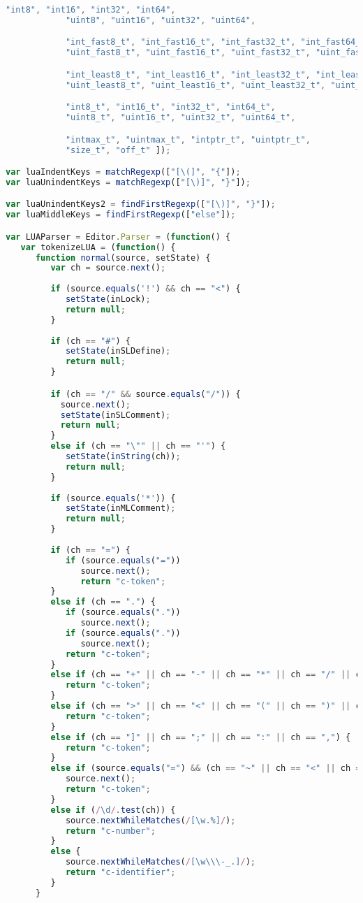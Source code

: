 \begin{lstlisting}[language=Javascript]
            "int8", "int16", "int32", "int64",
            "uint8", "uint16", "uint32", "uint64",

            "int_fast8_t", "int_fast16_t", "int_fast32_t", "int_fast64_t",
            "uint_fast8_t", "uint_fast16_t", "uint_fast32_t", "uint_fast64_t",

            "int_least8_t", "int_least16_t", "int_least32_t", "int_least64_t",
            "uint_least8_t", "uint_least16_t", "uint_least32_t", "uint_least64_t",

            "int8_t", "int16_t", "int32_t", "int64_t",
            "uint8_t", "uint16_t", "uint32_t", "uint64_t",

            "intmax_t", "uintmax_t", "intptr_t", "uintptr_t",
            "size_t", "off_t" ]);

var luaIndentKeys = matchRegexp(["[\(]", "{"]);
var luaUnindentKeys = matchRegexp(["[\)]", "}"]);

var luaUnindentKeys2 = findFirstRegexp(["[\)]", "}"]);
var luaMiddleKeys = findFirstRegexp(["else"]);

var LUAParser = Editor.Parser = (function() {
   var tokenizeLUA = (function() {
      function normal(source, setState) {
         var ch = source.next();
         
         if (source.equals('!') && ch == "<") {
         	setState(inLock);
         	return null;
         }
         
         if (ch == "#") {
         	setState(inSLDefine);
         	return null;
         }

         if (ch == "/" && source.equals("/")) {
           source.next();
           setState(inSLComment);
           return null;
         }
         else if (ch == "\"" || ch == "'") {
            setState(inString(ch));
            return null;
         }
        
         if (source.equals('*')) {
         	setState(inMLComment);
   	        return null;
         }
         
         if (ch == "=") {
            if (source.equals("="))
               source.next();
               return "c-token";
         }
         else if (ch == ".") {
            if (source.equals("."))
               source.next();
            if (source.equals("."))
               source.next();
            return "c-token";
         }
         else if (ch == "+" || ch == "-" || ch == "*" || ch == "/" || ch == "%" || ch == "^" ) {
            return "c-token";
         }
         else if (ch == ">" || ch == "<" || ch == "(" || ch == ")" || ch == "{" || ch == "}" || ch == "[" ) {
            return "c-token";
         }
         else if (ch == "]" || ch == ";" || ch == ":" || ch == ",") {
            return "c-token";
         }
         else if (source.equals("=") && (ch == "~" || ch == "<" || ch == ">")) {
            source.next();
            return "c-token";
         }
         else if (/\d/.test(ch)) {
            source.nextWhileMatches(/[\w.%]/);
            return "c-number";
         }
         else {
            source.nextWhileMatches(/[\w\\\-_.]/);
            return "c-identifier";
         }
      }
      

\end{lstlisting}
